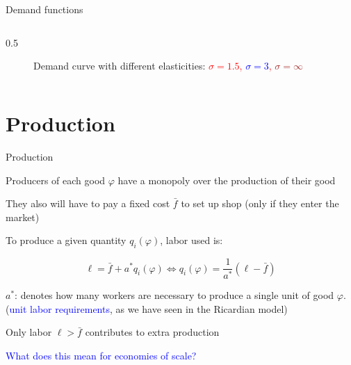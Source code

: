 \documentclass[notes,11pt, aspectratio=169, xcolor=table]{beamer}
\newcommand{\blue}[1]{\textcolor{blue}{#1}}
\newenvironment{wideitemize}{\itemize\addtolength{\itemsep}{10pt}}{\enditemize}
\begin{document}
\begin{frame}{Demand functions}
\begin{columns}
\begin{column}{0.5\textwidth}
{\begin{figure}[htp]
            \caption{Demand curve with different elasticities: \textcolor{red}{$\sigma=1.5$, \textcolor{blue}{$\sigma=3$}, \textcolor{brown}{$\sigma=\infty$}}}
        \label{fig: ces-demand}
    \end{figure}
    
        }

            \end{column}
\end{columns}
\end{frame}

\section{Production}

\begin{frame}{Production}

\begin{wideitemize}
    \item Producers of each good $\varphi$ have a monopoly over the production of their good
    \item<@-> They also will have to pay a fixed cost $\bar{f}$ to set up shop (only if they enter the market)

    \item<3-> To produce a given quantity $q_i(\varphi)$, labor used is:

    \begin{equation*}
         \ell = \bar{f} + a^*q_i(\varphi) \iff q_i(\varphi) = \frac{1}{a^*} (\ell - \bar{f})
    \end{equation*}

    \item $a^*$: denotes how many workers are necessary to produce a single unit of good $\varphi$. \\
    \qquad (\blue{unit labor requirements}, as we have seen in the Ricardian model) 

    \item<4-> Only labor $\ell > \bar{f}$ contributes to extra production
    \item \blue{What does this mean for economies of scale?}
\end{wideitemize}
    
\end{frame}
\end{document}

